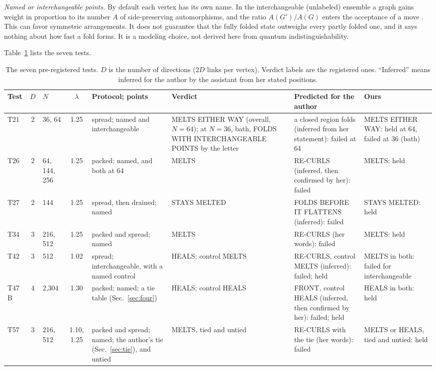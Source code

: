 \documentclass[aps,pre,10pt,twocolumn,superscriptaddress,nofootinbib]{revtex4-2}
\begin{document}
\emph{Named or interchangeable points.} By default each vertex has its own name. In the interchangeable
(unlabeled) ensemble a graph gains weight in proportion to its number $A$ of side-preserving automorphisms, and
the ratio $A(G')/A(G)$ enters the acceptance of a move \cite{DQM25,repo}. This can favor symmetric arrangements. It
does not guarantee that the fully folded state outweighs every partly folded one, and it says nothing about how fast
a fold forms. It is a modeling choice, not derived here from quantum indistinguishability.

Table~\ref{tab:tests} lists the seven tests.

\begin{table}[t]
\caption{The seven pre-registered tests. $D$ is the number of directions ($2D$ links per vertex). Verdict labels are
the registered ones. ``Inferred'' means inferred for the author by the assistant from her stated positions.}
\label{tab:tests}
\small
\setlength{\tabcolsep}{3pt}
\begin{tabular}{@{}lclcp{3.0cm}p{3.5cm}p{3.0cm}p{2.6cm}@{}}
\toprule
Test & $D$ & $N$ & $\lambda$ & Protocol; points & Verdict & Predicted for the author & Ours \\
\midrule
T21 & 2 & 36, 64 & 1.25 & spread; named and interchangeable & MELTS EITHER WAY (overall, $N = 64$); at
$N = 36$, bath, FOLDS WITH INTERCHANGEABLE POINTS by the letter & a closed region folds (inferred from her
statement): failed at 64 & MELTS EITHER WAY: held at 64, failed at 36 (bath) \\
T26 & 2 & 64, 144, 256 & 1.25 & packed; named, and both at 64 & MELTS & RE-CURLS (inferred, then confirmed by her):
failed & MELTS: held \\
T27 & 2 & 144 & 1.25 & spread, then drained; named & STAYS MELTED & FOLDS BEFORE IT FLATTENS (inferred): failed &
STAYS MELTED: held \\
T34 & 3 & 216, 512 & 1.25 & packed and spread; named & MELTS & RE-CURLS (her words): failed & MELTS: held \\
T42 & 3 & 512 & 1.02 & spread; interchangeable, with a named control & HEALS; control MELTS & RE-CURLS, control
MELTS (inferred): failed; held & MELTS in both: failed for interchangeable \\
T47 B & 4 & 2,304 & 1.30 & packed; named; a tie table (Sec.~\ref{sec:four}) & HEALS; control HEALS & FRONT, control HEALS
(inferred, then confirmed by her): failed; held & HEALS in both: held \\
T57 & 3 & 216, 512 & 1.10, 1.25 & packed and spread; named; the author's tie (Sec.~\ref{sec:tie}), and untied &
MELTS, tied and untied & RE-CURLS with the tie (her words): failed & MELTS or HEALS, tied and untied: held \\
\bottomrule
\end{tabular}
\end{table}
\end{document}

